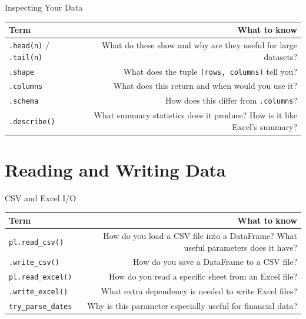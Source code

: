 \documentclass[9pt,aspectratio=169]{beamer}
\begin{document}
\begin{frame}{Inspecting Your Data}

\begin{tabular}{@{}lR@{}}
\toprule
\textbf{Term} & \textbf{What to know} \\
\midrule
\alert{\texttt{.head(n)} / \texttt{.tail(n)}} & What do these show and why are they useful for large datasets? \\[0.8em]
\alert{\texttt{.shape}} & What does the tuple \texttt{(rows, columns)} tell you? \\[0.8em]
\alert{\texttt{.columns}} & What does this return and when would you use it? \\[0.8em]
\alert{\texttt{.schema}} & How does this differ from \texttt{.columns}? \\[0.8em]
\alert{\texttt{.describe()}} & What summary statistics does it produce? How is it like Excel's summary? \\
\bottomrule
\end{tabular}

\end{frame}


\section{Reading and Writing Data}

\begin{frame}{CSV and Excel I/O}

\begin{tabular}{@{}lR@{}}
\toprule
\textbf{Term} & \textbf{What to know} \\
\midrule
\alert{\texttt{pl.read\_csv()}} & How do you load a CSV file into a DataFrame? What useful parameters does it have? \\[0.8em]
\alert{\texttt{.write\_csv()}} & How do you save a DataFrame to a CSV file? \\[0.8em]
\alert{\texttt{pl.read\_excel()}} & How do you read a specific sheet from an Excel file? \\[0.8em]
\alert{\texttt{.write\_excel()}} & What extra dependency is needed to write Excel files? \\[0.8em]
\alert{\texttt{try\_parse\_dates}} & Why is this parameter especially useful for financial data? \\
\bottomrule
\end{tabular}

\end{frame}
\end{document}
